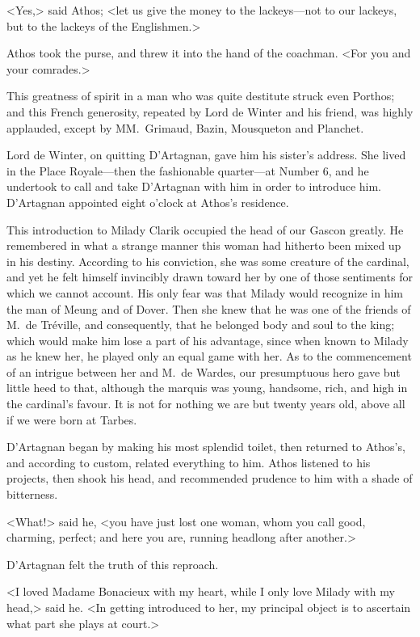 <Yes,> said Athos; <let us give the money to the lackeys—not to our lackeys, but to the lackeys of the Englishmen.> 

Athos took the purse, and threw it into the hand of the coachman. <For you and your comrades.> 

This greatness of spirit in a man who was quite destitute struck even Porthos; and this French generosity, repeated by Lord de Winter and his friend, was highly applauded, except by MM.~Grimaud, Bazin, Mousqueton and Planchet. 

Lord de Winter, on quitting D'Artagnan, gave him his sister's address. She lived in the Place Royale—then the fashionable quarter—at Number 6, and he undertook to call and take D'Artagnan with him in order to introduce him. D'Artagnan appointed eight o'clock at Athos's residence. 

This introduction to Milady Clarik occupied the head of our Gascon greatly. He remembered in what a strange manner this woman had hitherto been mixed up in his destiny. According to his conviction, she was some creature of the cardinal, and yet he felt himself invincibly drawn toward her by one of those sentiments for which we cannot account. His only fear was that Milady would recognize in him the man of Meung and of Dover. Then she knew that he was one of the friends of M.~de Tréville, and consequently, that he belonged body and soul to the king; which would make him lose a part of his advantage, since when known to Milady as he knew her, he played only an equal game with her. As to the commencement of an intrigue between her and M.~de Wardes, our presumptuous hero gave but little heed to that, although the marquis was young, handsome, rich, and high in the cardinal's favour. It is not for nothing we are but twenty years old, above all if we were born at Tarbes. 

D'Artagnan began by making his most splendid toilet, then returned to Athos's, and according to custom, related everything to him. Athos listened to his projects, then shook his head, and recommended prudence to him with a shade of bitterness. 

<What!> said he, <you have just lost one woman, whom you call good, charming, perfect; and here you are, running headlong after another.> 

D'Artagnan felt the truth of this reproach. 

<I loved Madame Bonacieux with my heart, while I only love Milady with my head,> said he. <In getting introduced to her, my principal object is to ascertain what part she plays at court.> 

